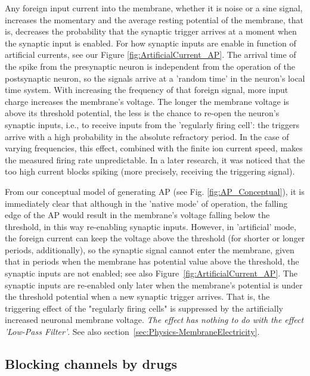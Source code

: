 Any foreign input current into the membrane, whether it is noise or a sine signal,
increases the momentary and the average resting potential of the membrane,
that is, decreases the probability that the synaptic trigger
arrives at a moment when the synaptic input is enabled.
For how synaptic inputs are enable in function of artificial currents, see our Figure \ref{fig:ArtificialCurrent_AP}.
The arrival time of the spike from the presynaptic neuron is independent
from the operation of the postsynaptic neuron, so the signals arrive at a 'random time'
in the neuron's local time system.
With increasing the frequency of that foreign signal,
more input charge increases the membrane's voltage.
The longer the membrane voltage is above its threshold potential,
the less is the chance to re-open the neuron's synaptic inputs, i.e.,
to receive inputs from the 'regularly firing cell':
the triggers arrive with a high probability in the absolute refractory period.
In the case of varying frequencies, this effect, combined with the finite ion current speed, makes the measured firing rate unpredictable. In a later research, it was noticed that \cite{DepolarizationBianchi:2012}
the too high current blocks spiking (more precisely,
receiving the triggering signal).

From our conceptual model of generating \gls{AP}
(see Fig. \ref{fig:AP_Conceptual}),
it is immediately clear that although in the 'native mode' of operation,
the falling edge of the \gls{AP}
would result in the membrane's voltage falling below the threshold,
in this way re-enabling synaptic inputs.
However, in 'artificial' mode, the foreign current can keep the voltage above the threshold
(for shorter or longer periods, additionally),
so the synaptic signal cannot enter the membrane, given that
in periods when the membrane has potential value above the threshold,
the synaptic inputs are not enabled; see also Figure~\ref{fig:ArtificialCurrent_AP}.
The synaptic inputs are re-enabled only  later when the membrane's potential is
under the threshold potential when a new synaptic trigger arrives.
That is, the triggering effect
of the "regularly firing cells" is suppressed by the artificially
increased neuronal membrane voltage.
\textit{The effect has nothing to do with the effect 'Low-Pass Filter'}. See also section~\ref{sec:Physics-MembraneElectricity}.


\subsection{Blocking channels by drugs \label{sec:BlockingChannels}}

